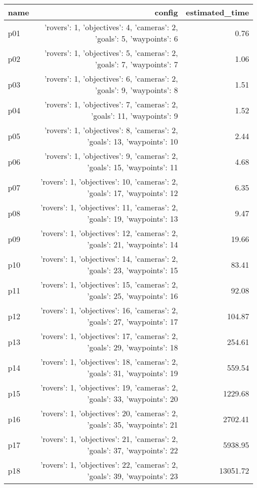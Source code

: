 \documentclass{article}
\begin{document}
                            \begin{center}
                            \scriptsize
                            \begin{tabular}{@{}l|r|r@{}}
                            name & config & estimated\_time\\\midrule
                              p01&{'rovers': 1, 'objectives': 4, 'cameras': 2, 'goals': 5, 'waypoints': 6}&0.76\\
  p02&{'rovers': 1, 'objectives': 5, 'cameras': 2, 'goals': 7, 'waypoints': 7}&1.06\\
  p03&{'rovers': 1, 'objectives': 6, 'cameras': 2, 'goals': 9, 'waypoints': 8}&1.51\\
  p04&{'rovers': 1, 'objectives': 7, 'cameras': 2, 'goals': 11, 'waypoints': 9}&1.52\\
  p05&{'rovers': 1, 'objectives': 8, 'cameras': 2, 'goals': 13, 'waypoints': 10}&2.44\\
  p06&{'rovers': 1, 'objectives': 9, 'cameras': 2, 'goals': 15, 'waypoints': 11}&4.68\\
  p07&{'rovers': 1, 'objectives': 10, 'cameras': 2, 'goals': 17, 'waypoints': 12}&6.35\\
  p08&{'rovers': 1, 'objectives': 11, 'cameras': 2, 'goals': 19, 'waypoints': 13}&9.47\\
  p09&{'rovers': 1, 'objectives': 12, 'cameras': 2, 'goals': 21, 'waypoints': 14}&19.66\\
  p10&{'rovers': 1, 'objectives': 14, 'cameras': 2, 'goals': 23, 'waypoints': 15}&83.41\\
  p11&{'rovers': 1, 'objectives': 15, 'cameras': 2, 'goals': 25, 'waypoints': 16}&92.08\\
  p12&{'rovers': 1, 'objectives': 16, 'cameras': 2, 'goals': 27, 'waypoints': 17}&104.87\\
  p13&{'rovers': 1, 'objectives': 17, 'cameras': 2, 'goals': 29, 'waypoints': 18}&254.61\\
  p14&{'rovers': 1, 'objectives': 18, 'cameras': 2, 'goals': 31, 'waypoints': 19}&559.54\\
  p15&{'rovers': 1, 'objectives': 19, 'cameras': 2, 'goals': 33, 'waypoints': 20}&1229.68\\
  p16&{'rovers': 1, 'objectives': 20, 'cameras': 2, 'goals': 35, 'waypoints': 21}&2702.41\\
  p17&{'rovers': 1, 'objectives': 21, 'cameras': 2, 'goals': 37, 'waypoints': 22}&5938.95\\
  p18&{'rovers': 1, 'objectives': 22, 'cameras': 2, 'goals': 39, 'waypoints': 23}&13051.72\\

\end{tabular}
\end{center}
\end{document}
